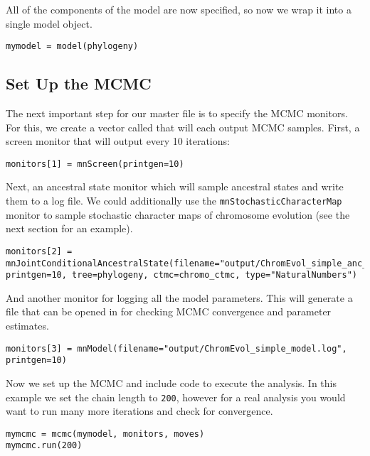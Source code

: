 All of the components of the model are now specified,
so now we wrap it into a single model object.
{\tt \begin{snugshade*}
\begin{lstlisting}
mymodel = model(phylogeny)
\end{lstlisting}
\end{snugshade*}}


\subsection{Set Up the MCMC}\label{subsect:Exercise-CompleteMCMC}


The next important step for our master \Rev file is to specify the MCMC monitors.
For this, we create a vector called  that will each output MCMC samples. 
First, a screen monitor that will output every 10 iterations:
{\tt \begin{snugshade*}
\begin{lstlisting}
monitors[1] = mnScreen(printgen=10)
\end{lstlisting}
\end{snugshade*}}

Next, an ancestral state monitor which will sample ancestral states and write them to a log file.
We could additionally use the \texttt{mnStochasticCharacterMap} monitor to sample
stochastic character maps of chromosome evolution (see the next section for an example).
{\tt \begin{snugshade*}
\begin{lstlisting}
monitors[2] = mnJointConditionalAncestralState(filename="output/ChromEvol_simple_anc_states.log", printgen=10, tree=phylogeny, ctmc=chromo_ctmc, type="NaturalNumbers")
\end{lstlisting}
\end{snugshade*}}

And another monitor for logging all the model parameters. This will generate a file that can be opened in \Tracer for checking MCMC convergence and parameter estimates.
{\tt \begin{snugshade*}
\begin{lstlisting}
monitors[3] = mnModel(filename="output/ChromEvol_simple_model.log", printgen=10)
\end{lstlisting}
\end{snugshade*}}

Now we set up the MCMC and include code to execute the analysis. In this example we set the chain length to \texttt{200}, however
for a real analysis you would want to run many more iterations and check for convergence.
{\tt \begin{snugshade*}
\begin{lstlisting}
mymcmc = mcmc(mymodel, monitors, moves)
mymcmc.run(200)
\end{lstlisting}
\end{snugshade*}}


